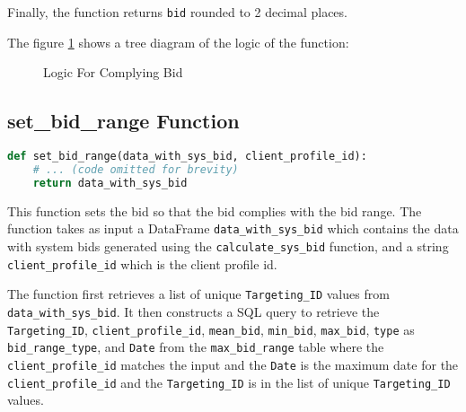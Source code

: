 Finally, the function returns \verb|bid| rounded to 2 decimal places.

The figure \ref{fig:comply_bid_range_one} shows a tree diagram of the logic of the function:

\begin{figure}
    \centering
    \caption[short]{Logic For Complying Bid}
    \label{fig:comply_bid_range_one}
\end{figure}

\subsection{set\_bid\_range Function}

\begin{lstlisting}[language=Python]
def set_bid_range(data_with_sys_bid, client_profile_id):
    # ... (code omitted for brevity)
    return data_with_sys_bid
\end{lstlisting}

This function sets the bid so that the bid complies with the bid range. The function takes as input a DataFrame \verb|data_with_sys_bid| which contains the data with system bids generated using the \verb|calculate_sys_bid| function, and a string \verb|client_profile_id| which is the client profile id.

The function first retrieves a list of unique \verb|Targeting_ID| values from \verb|data_with_sys_bid|. It then constructs a SQL query to retrieve the \verb|Targeting_ID|, \verb|client_profile_id|, \verb|mean_bid|, \verb|min_bid|, \verb|max_bid|, \verb|type| as \verb|bid_range_type|, and \verb|Date| from the \verb|max_bid_range| table where the \verb|client_profile_id| matches the input and the \verb|Date| is the maximum date for the \verb|client_profile_id| and the \verb|Targeting_ID| is in the list of unique \verb|Targeting_ID| values.


